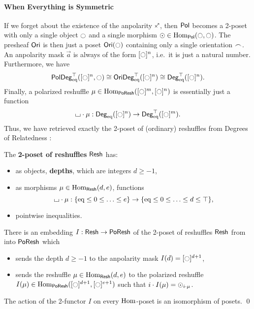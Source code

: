 \documentclass[a4paper]{memoir}
\begin{document}
\paragraph{When Everything is Symmetric}
If we forget about the existence of the anpolarity $\ypolar$, then ${\mathsf{Pol}}$ becomes a 2-poset with only a single object $\npolar$ and a single morphism $\nonpol \in \Hom_\polcat(\npolar, \npolar)$.
The presheaf ${\mathsf{Ori}}$ is then just a poset $\oripsh(\npolar)$ containing only a single orientation ${\frown}$.
An anpolarity mask $\vec a$ is always of the form $[\npolar]^n$, i.e.\ it is just a natural number.
Furthermore, we have
\[
	\poldegeqtop([\npolar]^n, \npolar) \cong \oridegeqtop([\npolar]^n) \cong \Degeqtop([\npolar]^n).
\]
Finally, a polarized reshuffle $\mu \in \Hom_\poreshcat([\npolar]^m, [\npolar]^n)$ is essentially just a function
\[
	\loch \cdot \mu : \Degeq([\npolar]^n) \to \Degeqtop([\npolar]^m).
\]
Thus, we have retrieved exactly the 2-poset of (ordinary) reshuffles from Degrees of Relatedness \cite{reldtt,reldtt-techreport}:
\begin{definition}
	The \textbf{2-poset of reshuffles} $\mathsf{Resh}$ has:
	\begin{itemize}
		\item as objects, \textbf{depths}, which are integers $d \geq -1$,
		\item as morphisms $\mu \in {\mathrm{Hom}}_{\mathsf{Resh}}(d, e)$, functions
		\[
			{\llcorner\hspace{-.4ex}\lrcorner} \cdot \mu : \mathopen{}\left\{ {\mathrm{eq}} \leq 0 \leq \ldots \leq e \right\}\mathclose{} \to \mathopen{}\left\{ {\mathrm{eq}} \leq 0 \leq \ldots \leq d \leq \top \right\}\mathclose{},
		\]
		\item pointwise inequalities.
	\end{itemize}
\end{definition}
\begin{theorem}
	There is an embedding $I : \mathsf{Resh} \to \mathsf{PoResh}$ of the 2-poset of reshuffles $\mathsf{Resh}$ from \cite[def.\ 6.2.7]{reldtt-techreport} into $\mathsf{PoResh}$ which
	\begin{itemize}
		\item sends the depth $d \geq -1$ to the anpolarity mask $I(d) = [\npolar]^{d+1}$,
		\item sends the reshuffle $\mu \in {\mathrm{Hom}}_{\mathsf{Resh}}(d, e)$ to the polarized reshuffle $I(\mu) \in \Hom_\poreshcat([\npolar]^{d+1}, [\npolar]^{e+1})$
		such that $i \cdot I(\mu) = {{\odot}}_{i \cdot \mu}$.
	\end{itemize}
	The action of the 2-functor $I$ on every ${\mathrm{Hom}}$-poset is an isomorphism of posets. \qed
\end{theorem}
\end{document}
